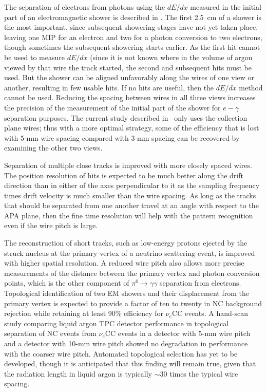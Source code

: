 The separation of electrons from photons using the $dE/dx$ measured in
the initial part of an electromagnetic shower is described in
\anxreco.  The first 2.5~cm of a shower is the most important, since 
subsequent showering stages have not yet taken place, leaving one MIP
for an electron and two for a photon conversion to two electrons,
though sometimes the subsequent showering starts earlier.  As the
first hit cannot be used to measure $dE/dx$ (since it is not known
where in the volume of argon viewed by that wire the track started,
the second and subsequent hits must be used.  But the shower can be
aligned unfavorably along the wires of one view or another, resulting
in few usable hits.  If no hits are useful, then the $dE/dx$ method
cannot be used.  Reducing the spacing between wires in all three views
increases the precision of the measurement of the initial part of the
shower for $e-\gamma$ separation purposes.  The current study
described in \anxreco\ only uses the collection plane wires; 
thus with a more optimal strategy, some of the efficiency that is lost
with 5-mm wire spacing compared with 3-mm spacing can be recovered by
examining the other two views.

Separation of multiple close tracks is improved with more closely
spaced wires.  The position resolution of hits is expected to be much
better along the drift direction than in either of the axes
perpendicular to it as the sampling frequency times drift velocity is
much smaller than the wire spacing.  As long as the tracks that should
be separated from one another travel at an angle with respect to the
APA plane, then the fine time resolution will help with the pattern
recognition even if the wire pitch is large.

The reconstruction of short tracks, such as low-energy protons ejected
by the struck nucleus at the primary vertex of a neutrino scattering
event, is improved with higher spatial resolution.  A reduced wire pitch also
allows more precise measurements of the distance between the
primary vertex and photon conversion points, which is the other
component of $\pi^0\rightarrow\gamma\gamma$ separation from electrons.
Topological identification of two EM showers and their displacement
from the primary vertex is expected to provide a factor of ten to
twenty in NC background rejection while retaining at least 90\%
efficiency for $\nu_e$CC events.  A hand-scan study comparing liquid
argon TPC detector performance in topological separation of NC events
from $\nu_e$CC events in a detector with 5-mm wire pitch and a
detector with 10-mm wire pitch\cite{2008-hand-scan} showed no
degradation in performance with the coarser wire pitch.  Automated
topological selection has yet to be developed, though it is
anticipated that this finding will remain true, given that the
radiation length in liquid argon is typically $\sim$30 times the
typical wire spacing.

